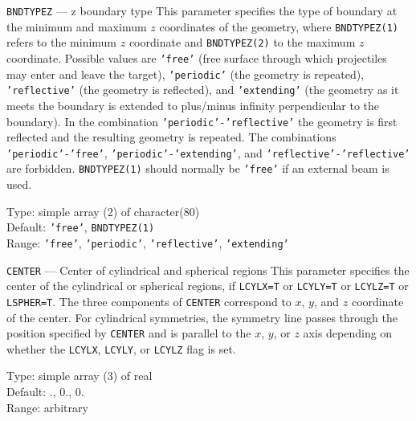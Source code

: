 \begin{keydescription}{\texttt{BNDTYPEZ} --- z boundary type}
%
  This parameter specifies the type of boundary at the minimum and maximum $z$
  coordinates of the geometry, where \texttt{BNDTYPEZ(1)} refers to the minimum
  $z$ coordinate and \texttt{BNDTYPEZ(2)} to the maximum $z$ coordinate.
  Possible values are \texttt{'free'} (free surface through which projectiles
  may enter and leave the target), \texttt{'periodic'} (the geometry is 
  repeated), \texttt{'reflective'} (the geometry is reflected), and 
  \texttt{'extending'} (the geometry as it meets the boundary is extended to 
  plus/minus infinity perpendicular to the boundary). In the combination
  \texttt{'periodic'-'reflective'} the geometry is first reflected 
  and the resulting geometry is repeated. The combinations 
  \texttt{'periodic'-'free'}, \texttt{'periodic'-'extending'}, 
  and \texttt{'reflective'-'reflective'} are forbidden. \texttt{BNDTYPEZ(1)}
  should normally be \texttt{'free'} if an external beam is used. 
  \begin{keytab}
    Type:    \> simple array (2) of character(80) \\
    Default: \> \texttt{'free'}, \texttt{BNDTYPEZ(1)} \\
    Range:   \> \texttt{'free'}, \texttt{'periodic'}, \texttt{'reflective'}, 
                \texttt{'extending'} 
  \end{keytab}
\end{keydescription}


\begin{keydescription}{\texttt{CENTER} --- Center of cylindrical and spherical 
regions}
%
  This parameter specifies the center of the cylindrical or spherical regions,
  if \texttt{LCYLX=T} or \texttt{LCYLY=T} or \texttt{LCYLZ=T} or 
  \texttt{LSPHER=T}. The three components of \texttt{CENTER} correspond to $x$, 
  $y$, and $z$ coordinate of the center. For cylindrical symmetries, the
  symmetry line passes through the position specified by \texttt{CENTER} and is
  parallel to the $x$, $y$, or $z$ axis depending on whether the \texttt{LCYLX},
  \texttt{LCYLY}, or \texttt{LCYLZ} flag is set.
  \begin{keytab}
    Type:    \> simple array (3) of real \\
    Default: ., 0., 0. \\
    Range:   \> arbitrary
  \end{keytab}
\end{keydescription}

